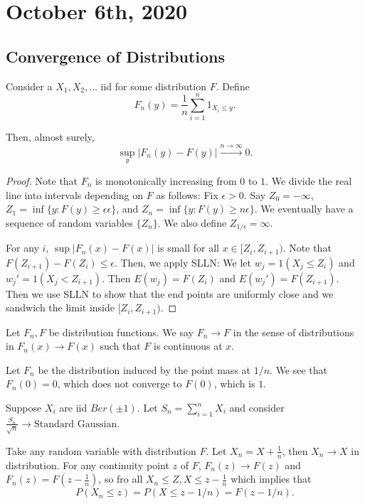 \documentclass[11pt]{scrartcl}
\begin{document}
\section{October 6th, 2020}
\subsection{Convergence of Distributions}
\begin{lemma} Consider a $X_1, X_2, \dots$ iid for some distribution $F$.  Define
$$F_n(y) = \frac{1}{n}\sum_{i=1}^n 1_{X_i \le y}.$$

Then, almost surely, $$\sup_y |F_n(y) - F(y)| \xrightarrow{n \rightarrow \infty} 0.$$
\end{lemma}
\begin{proof}
Note that $F_n$ is monotonically increasing from $0$ to $1$.    We divide the real line into intervals depending on $F$ as follows:  Fix $\epsilon > 0$.  Say $Z_0 = -\infty$, $Z_1 = \inf \{y : F(y) \ge \epsilon \epsilon\}$, and $Z_n = \inf \{y : F(y) \ge n \epsilon\}$.  We eventually have a sequence of random variables $\{Z_n\}$.  We also define $Z_{1/\epsilon} = \infty$.  

For any $i$, $\sup |F_n(x) - F(x)|$ is small for all $x \in [Z_i, Z_{i+1})$.   Note that $F(Z_{i+1}) - F(Z_i) \le \epsilon$.  Then, we apply SLLN:  We let $w_j = 1(X_j \le Z_i)$ and $w_j' = 1(X_j < Z_{i+1})$.  Then $E(w_j) = F(Z_i)$ and $E(w_j') = F(Z_{i+1})$.  Then we use SLLN to show that the end points are uniformly close and we sandwich the limit inside $[Z_i, Z_{i+1})$.
\end{proof}

\begin{definition} Let $F_n, F$ be distribution functions.  We say $F_n \rightarrow F$ in the sense of distributions in $F_n(x) \rightarrow F(x)$ such that $F$ is continuous at $x$.
\end{definition}

\begin{example} Let $F_n$ be the distribution induced by the point mass at $1/n$.  We see that $F_n(0) = 0$, which does not converge to $F(0)$, which is $1$.  
\end{example}
\begin{example} Suppose $X_i$ are iid $Ber(\pm 1)$.  Let $S_n = \sum_{i=1}^n X_i$ and consider $\frac{S_n}{\sqrt{n}} \rightarrow \text{Standard Gaussian}$.

Take any random variable with distribution $F$.  Let $X_n = X + \frac{1}{n}$, then $X_n \rightarrow X$ in distribution.  For any continuity point $z$ of $F$, $F_n(z) \rightarrow F(z)$ and $F_n(z) = F(z - \frac{1}{n})$, so fro all $X_n \le Z, X \le z-\frac{1}{n}$ which implies that 
$$P(X_n \le z) = P(X \le z-1/n) = F(z-1/n).$$
\end{example}
\end{document}
